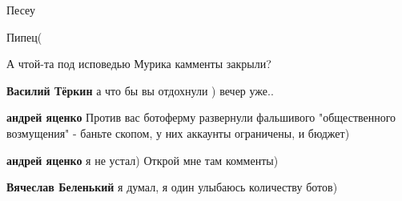 \begin{itemize}
Песеу

 
Пипец(

 
А чтой-та под исповедью Мурика камменты закрыли?

\begin{itemize}
 
\textbf{Василий Тёркин} а что бы вы отдохнули ) вечер уже..

 
\textbf{андрей яценко}
Против вас ботоферму развернули фальшивого "общественного возмущения" - баньте скопом, у них аккаунты ограничены, и бюджет)

 
\textbf{андрей яценко} я не устал) Открой мне там комменты)

 
\textbf{Вячеслав Беленький} я думал, я один улыбаюсь количеству ботов)
\end{itemize}


\end{itemize}
